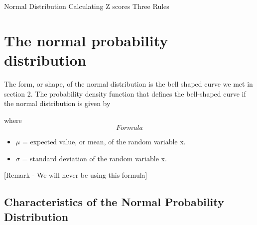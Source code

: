 \documentclass[12pt, a4paper]{report}
\author{ } \date{ }
\theoremstyle{definition}
\theoremstyle{remark}
\begin{document}
Normal Distribution 
Calculating Z scores
Three Rules 


\section{The normal probability distribution}
The form, or shape, of the normal distribution is the bell shaped curve we met in section 2.
The probability density function that defines the bell-shaped curve if the normal distribution is given by

 
where 
\[ Formula\]
\begin{itemize}
\item $\mu$  = expected value, or mean, of the random variable x.
\item $\sigma$  = standard deviation of the random variable x.
\end{itemize}

[Remark - We will never be using this formula]

 
\subsection{Characteristics of the Normal Probability Distribution}
\end{document}
